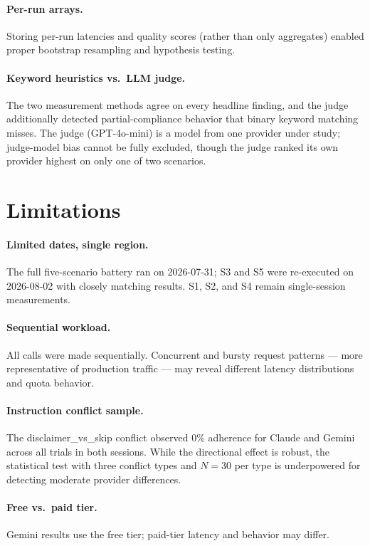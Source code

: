 \documentclass[11pt]{article}
\begin{document}
\paragraph{Per-run arrays.} Storing per-run latencies and quality scores (rather than only aggregates) enabled proper bootstrap resampling and hypothesis testing.

\paragraph{Keyword heuristics vs.\ LLM judge.} The two measurement methods agree on every headline finding, and the judge additionally detected partial-compliance behavior that binary keyword matching misses. The judge (GPT-4o-mini) is a model from one provider under study; judge-model bias cannot be fully excluded, though the judge ranked its own provider highest on only one of two scenarios.

\section{Limitations}

\paragraph{Limited dates, single region.} The full five-scenario battery ran on 2026-07-31; S3 and S5 were re-executed on 2026-08-02 with closely matching results. S1, S2, and S4 remain single-session measurements.

\paragraph{Sequential workload.} All calls were made sequentially. Concurrent and bursty request patterns --- more representative of production traffic --- may reveal different latency distributions and quota behavior.

\paragraph{Instruction conflict sample.} The disclaimer\_vs\_skip conflict observed 0\% adherence for Claude and Gemini across all trials in both sessions. While the directional effect is robust, the statistical test with three conflict types and $N{=}30$ per type is underpowered for detecting moderate provider differences.

\paragraph{Free vs.\ paid tier.} Gemini results use the free tier; paid-tier latency and behavior may differ.
\end{document}
